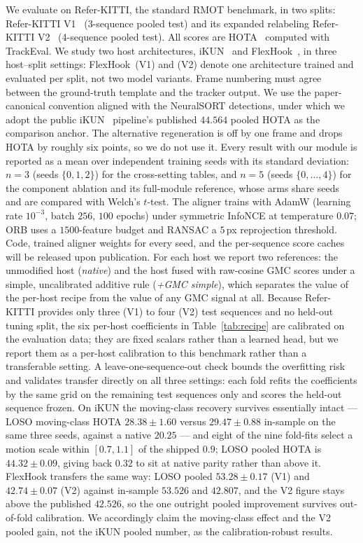 \documentclass[sigconf,review,anonymous]{acmart}
\begin{document}
We evaluate on Refer-KITTI, the standard RMOT benchmark, in two splits: Refer-KITTI V1~\cite{transrmot} (3-sequence pooled test) and its expanded relabeling Refer-KITTI V2~\cite{temprmot} (4-sequence pooled test). All scores are HOTA~\cite{hota} computed with TrackEval. We study two host architectures, iKUN~\cite{ikun} and FlexHook~\cite{flexhook}, in three host--split settings: FlexHook~(V1) and (V2) denote one architecture trained and evaluated per split, not two model variants. Frame numbering must agree between the ground-truth template and the tracker output. We use the paper-canonical convention aligned with the NeuralSORT detections, under which we adopt the public iKUN~\cite{ikun} pipeline's published $44.564$ pooled HOTA as the comparison anchor. The alternative regeneration is off by one frame and drops HOTA by roughly six points, so we do not use it. Every result with our module is reported as a mean over independent training seeds with its standard deviation: $n{=}3$ (seeds $\{0,1,2\}$) for the cross-setting tables, and $n{=}5$ (seeds $\{0,\dots,4\}$) for the component ablation and its full-module reference, whose arms share seeds and are compared with Welch's $t$-test. The aligner trains with AdamW (learning rate $10^{-3}$, batch $256$, $100$ epochs) under symmetric InfoNCE at temperature $0.07$; ORB uses a $1500$-feature budget and RANSAC a $5$\,px reprojection threshold. Code, trained aligner weights for every seed, and the per-sequence score caches will be released upon publication. For each host we report two references: the unmodified host (\emph{native}) and the host fused with raw-cosine GMC scores under a simple, uncalibrated additive rule (\emph{+GMC simple}), which separates the value of the per-host recipe from the value of any GMC signal at all. Because Refer-KITTI provides only three (V1) to four (V2) test sequences and no held-out tuning split, the six per-host coefficients in Table~\ref{tab:recipe} are calibrated on the evaluation data; they are fixed scalars rather than a learned head, but we report them as a per-host calibration to this benchmark rather than a transferable setting. A leave-one-sequence-out check bounds the overfitting risk and validates transfer directly on all three settings: each fold refits the coefficients by the same grid on the remaining test sequences only and scores the held-out sequence frozen. On iKUN the moving-class recovery survives essentially intact --- LOSO moving-class HOTA $28.38 \pm 1.60$ versus $29.47 \pm 0.88$ in-sample on the same three seeds, against a native $20.25$ --- and eight of the nine fold-fits select a motion scale within $[0.7, 1.1]$ of the shipped $0.9$; LOSO pooled HOTA is $44.32 \pm 0.09$, giving back $0.32$ to sit at native parity rather than above it. FlexHook transfers the same way: LOSO pooled $53.28 \pm 0.17$ (V1) and $42.74 \pm 0.07$ (V2) against in-sample $53.526$ and $42.807$, and the V2 figure stays above the published $42.526$, so the one outright pooled improvement survives out-of-fold calibration. We accordingly claim the moving-class effect and the V2 pooled gain, not the iKUN pooled number, as the calibration-robust results.
\end{document}
